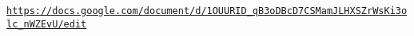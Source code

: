 \href{https://docs.google.com/document/d/1OUURID_qB3oDBcD7CSMamJLHXSZrWsKi3olc_nWZEvU/edit}{\tt https\+://docs.\+google.\+com/document/d/1\+O\+U\+U\+R\+I\+D\+\_\+q\+B3o\+D\+Bc\+D7\+C\+S\+Mam\+J\+L\+H\+X\+S\+Zr\+Ws\+Ki3olc\+\_\+n\+W\+Z\+Ev\+U/edit} 